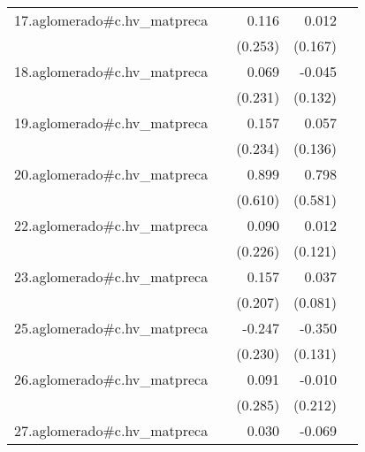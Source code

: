 {\begin{longtable}{l*{4}{D{.}{.}{-1}}}
\addlinespace
17.aglomerado#c.hv\_matpreca&                     &       0.116         &       0.012         &                     \\
            &                     &     (0.253)         &     (0.167)         &                     \\
\addlinespace
18.aglomerado#c.hv\_matpreca&                     &       0.069         &      -0.045         &                     \\
            &                     &     (0.231)         &     (0.132)         &                     \\
\addlinespace
19.aglomerado#c.hv\_matpreca&                     &       0.157         &       0.057         &                     \\
            &                     &     (0.234)         &     (0.136)         &                     \\
\addlinespace
20.aglomerado#c.hv\_matpreca&                     &       0.899         &       0.798         &                     \\
            &                     &     (0.610)         &     (0.581)         &                     \\
\addlinespace
22.aglomerado#c.hv\_matpreca&                     &       0.090         &       0.012         &                     \\
            &                     &     (0.226)         &     (0.121)         &                     \\
\addlinespace
23.aglomerado#c.hv\_matpreca&                     &       0.157         &       0.037         &                     \\
            &                     &     (0.207)         &     (0.081)         &                     \\
\addlinespace
25.aglomerado#c.hv\_matpreca&                     &      -0.247         &      -0.350\sym{**} &                     \\
            &                     &     (0.230)         &     (0.131)         &                     \\
\addlinespace
26.aglomerado#c.hv\_matpreca&                     &       0.091         &      -0.010         &                     \\
            &                     &     (0.285)         &     (0.212)         &                     \\
\addlinespace
27.aglomerado#c.hv\_matpreca&                     &       0.030         &      -0.069         &                     \\

\end{longtable}}

